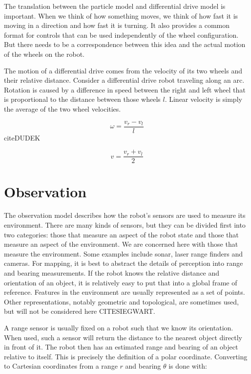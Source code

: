\documentclass[12pt]{report}
\begin{document}
The translation between the particle model and differential drive model is important.  When we think of how something moves, we think of how fast it is moving in a direction and how fast it is turning.  It also provides a common format for controls that can be used independently of the wheel configuration.  But there needs to be a correspondence between this idea and the actual motion of the wheels on the robot.  

The motion of a differential drive comes from the velocity of its two wheels and their relative distance.  Consider a differential drive robot traveling along an arc.  Rotation is caused by a difference in speed between the right and left wheel that is proportional to the distance between those wheels $l$.  Linear velocity is simply the average of the two wheel velocities.
  
\begin{equation}
\label{differential_drive_rotation}
\omega = \frac{v_r - v_l}{l}
\end{equation}
cite{DUDEK}

\begin{equation}
\label{differential_drive_velocity}
v = \frac{v_r + v_l}{2}
\end{equation}


\section{Observation}
The observation model describes how the robot's sensors are used to measure its environment.  There are many kinds of sensors, but they can be divided first into two categories: those that measure an aspect of the robot state and those that measure an aspect of the environment.  We are concerned here with those that measure the environment.  Some examples include sonar, laser range finders and cameras.  For mapping, it is best to abstract the details of perception into range and bearing measurements.  If the robot knows the relative distance and orientation of an object, it is relatively easy to put that into a global frame of reference.  Features in the environment are usually represented as a set of points. Other representations, notably geometric and topological, are sometimes used, but will not be considered here CITE{SIEGWART}.  

A range sensor is usually fixed on a robot such that we know its orientation.  When used, such a sensor will return the distance to the nearest object directly in front of it.  The robot then has an estimated range and bearing of an object relative to itself.  This is precisely the definition of a polar coordinate.  Converting to Cartesian coordinates from a range $r$ and bearing $\theta$ is done with:
\end{document}
